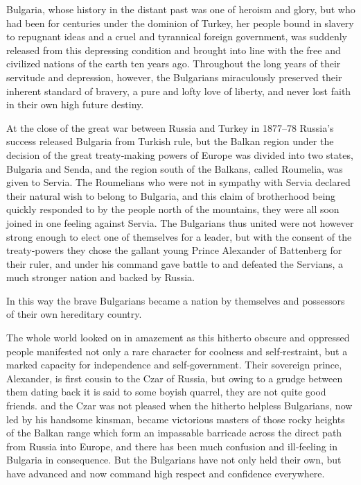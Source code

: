 \documentclass[12pt]{book}
\begin{document}
Bulgaria, whose history in the distant past was one of heroism and glory, but
who had been for centuries under the dominion of Turkey, her people bound in
slavery to repugnant ideas and a cruel and tyrannical foreign government, was
suddenly released from this depressing condition and brought into line with the
free and civilized nations of the earth ten years ago. Throughout the long years of
their servitude and depression, however, the Bulgarians miraculously preserved
their inherent standard of bravery, a pure and lofty love of liberty, and never lost
faith in their own high future destiny.

At the close of the great war between Russia and Turkey in 1877–78 Russia’s
success released Bulgaria from Turkish rule, but the Balkan region under the
decision of the great treaty‐making powers of Europe was divided into two states,
Bulgaria and Senda, and the region south of the Balkans, called Roumelia, was
given to Servia. The Roumelians who were not in sympathy with Servia declared
their natural wish to belong to Bulgaria, and this claim of brotherhood being
quickly responded to by the people north of the mountains, they were all soon
joined in one feeling against Servia. The Bulgarians thus united were not however
strong enough to elect one of themselves for a leader, but with the consent of the
treaty‐powers they chose the gallant young Prince Alexander of Battenberg for
their ruler, and under his command gave battle to and defeated the Servians, a
much stronger nation and backed by Russia.

In this way the brave Bulgarians became a nation by themselves and possessors
of their own hereditary country.

The whole world looked on in amazement as this hitherto obscure and oppressed people manifested not only a rare character for coolness and self‐restraint,
but a marked capacity for independence and self‐government. Their sovereign
prince, Alexander, is first cousin to the Czar of Russia, but owing to a grudge
between them dating back it is said to some boyish quarrel, they are not quite
good friends. and the Czar was not pleased when the hitherto helpless Bulgarians,
now led by his handsome kinsman, became victorious masters of those rocky
heights of the Balkan range which form an impassable barricade across the direct
path from Russia into Europe, and there has been much confusion and ill‐feeling
in Bulgaria in consequence. But the Bulgarians have not only held their own, but
have advanced and now command high respect and confidence everywhere.
\end{document}
